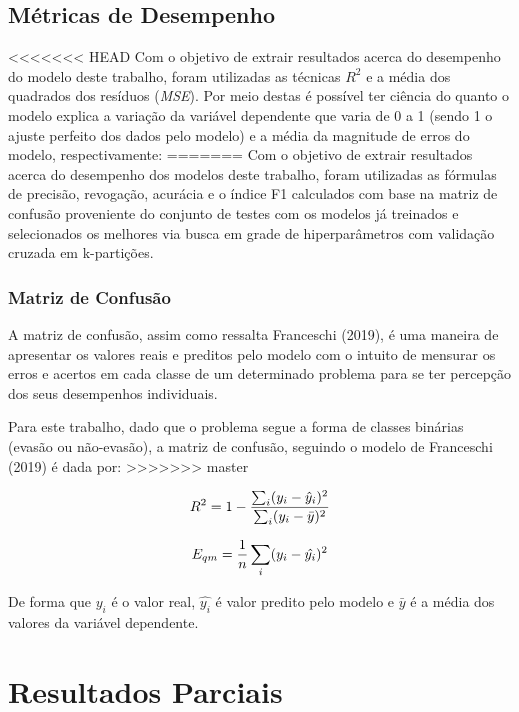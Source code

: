 \documentclass[english, spanish, brazilian]{RBIEarticle} %
\begin{document}
\subsection{Métricas de Desempenho}
<<<<<<< HEAD
Com o objetivo de extrair resultados acerca do desempenho do modelo deste trabalho, foram utilizadas as técnicas $R^2$ e a média dos quadrados dos resíduos (\textit{MSE}). Por meio destas é possível ter ciência do quanto o modelo explica a variação da variável dependente que varia de 0 a 1 (sendo 1 o ajuste perfeito dos dados pelo modelo) e a média da magnitude de erros do modelo, respectivamente:
=======
Com o objetivo de extrair resultados acerca do desempenho dos modelos deste trabalho, foram utilizadas as fórmulas de precisão, revogação, acurácia e o índice F1 calculados com base na matriz de confusão proveniente do conjunto de testes com os modelos já treinados e selecionados os melhores via busca em grade de hiperparâmetros com validação cruzada em k-partições.


\subsubsection{Matriz de Confusão}
A matriz de confusão, assim como ressalta Franceschi (2019), é uma maneira de apresentar os valores reais e preditos pelo modelo com o intuito de mensurar os erros e acertos em cada classe de um determinado problema para se ter percepção dos seus desempenhos individuais.

Para este trabalho, dado que o problema segue a forma de classes binárias (evasão ou não-evasão), a matriz de confusão, seguindo o modelo de Franceschi (2019) é dada por:
>>>>>>> master

\vspace{0.5cm}
\begin{equation}
\large R^2 = 1 - \frac{\sum_i(y_i-\hat{y}_i)^2}{\sum_i(y_i-\bar{y})^2}
\end{equation}
\vspace{0.5cm}

\vspace{0.5cm}
\begin{equation}
\large E_{qm} = \frac{1}{n} \sum_i(y_i-\hat{y_i})^2
\end{equation}
\vspace{0.5cm}

De forma que $y_i$ é o valor real, $\hat{y_i}$ é valor predito pelo modelo e $\bar{y}$ é a média dos valores da variável dependente.

\section{Resultados Parciais}
\end{document}
